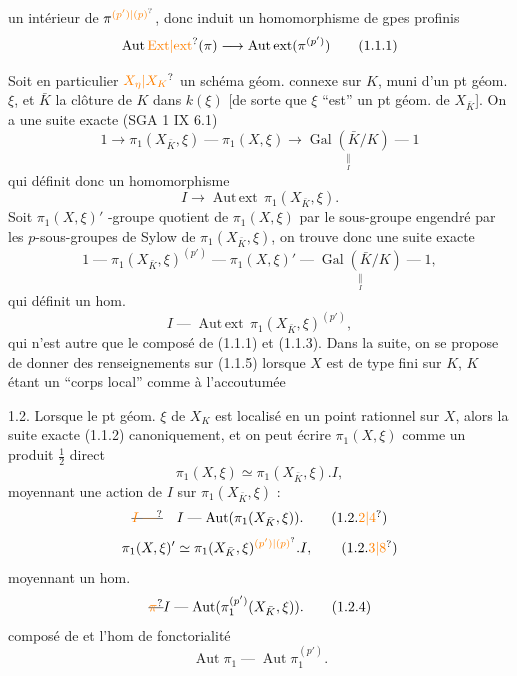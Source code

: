 un  intérieur de $\pi^{\unsure{(p')|(p)}}$, donc induit un homomorphisme de gpes profinis
\[
\operatorname{Aut\,\unsure{Ext|ext}}(\pi)\longrightarrow\operatorname{Aut\,ext}(\pi^{(p')})
\tag*{(1.1.1)}
\]

Soit en particulier $\unsure{X_\eta|X_K}$ un schéma géom. connexe sur $K$,  muni d'un pt géom. $\xi$, et $\bar K$ la clôture  de $K$ dans $k(\xi)$ [de sorte que $\xi$ ``est'' un pt géom. de $X_{\bar K}$]. On a une suite exacte (SGA 1 IX 6.1)
\[
1\to\pi_1(X_{\bar K},\xi)\mathrel{\text{---}}\pi_1(X,\xi)\longrightarrow
\underset{\underset{I}{\Vert}}{\operatorname{Gal}(\bar K/K)}\mathrel{\text{---}}1
\tag*{(1.1.2)}
\]
qui définit donc un homomorphisme
\[
I\longrightarrow\operatorname{Aut\,ext}\,\pi_1(X_{\bar K},\xi).
\tag*{(1.1.3)}
\]
Soit $\pi_1(X,\xi)'$   -groupe quotient de $\pi_1(X,\xi)$ par le sous-groupe   engendré par les $p$-sous-groupes de Sylow de $\pi_1(X_{\bar K},\xi)$, on trouve donc une suite exacte
\[
1\mathrel{\text{---}}\pi_1(X_{\bar K},\xi)^{(p')}\mathrel{\text{---}}\pi_1(X,\xi)'\mathrel{\text{---}}
\underset{\underset{I}{\Vert}}{\operatorname{Gal}(\bar K/K)}\mathrel{\text{---}}1,
\tag*{(1.1.4)}
\]
qui définit un hom.
\[
I\mathrel{\text{---}}\operatorname{Aut\,ext}\,\pi_1(X_{\bar K},\xi)^{(p')},
\tag*{(1.1.5)}
\]
qui n'est autre que le composé de (1.1.1) et (1.1.3).
Dans la suite, on se propose de donner des renseignements sur (1.1.5) lorsque $X$ est de type fini sur $K$, $K$ étant un ``corps local'' comme à l'accoutumée

1.2. Lorsque le  pt géom. $\xi$ de $X_K$ est localisé en un point rationnel sur $X$, alors la suite exacte (1.1.2)  canoniquement, et  on peut écrire $\pi_1(X,\xi)$ comme un produit $\frac12$ direct
\[
\pi_1(X,\xi)\simeq\pi_1(X_{\bar K},\xi).I,
\tag*{(1.2.1)}
\]
moyennant une action de $I$ sur $\pi_1(X_{\bar K},\xi)$ :
\[
\deleted{\unsure{I\mathrel{\text{---}}}}\quad I\mathrel{\text{---}}\operatorname{Aut}(\pi_1(X_{\bar K},\xi)).
\tag*{(1.2.\unsure{2|4})}
\]
\[
\pi_1(X,\xi)'\simeq\pi_1(X_{\bar K},\xi)^{\unsure{(p')|(p)}}.I,
\tag*{(1.2.\unsure{3|8})}
\]
moyennant un hom.
\[
\deleted{\unsure{\pi}}I\mathrel{\text{---}}\operatorname{Aut}(\pi_1^{(p')}(X_{\bar K},\xi)).
\tag*{(1.2.4)}
\]
composé de  et l'hom de fonctorialité
\[
\operatorname{Aut}\pi_1\mathrel{\text{---}}\operatorname{Aut}\pi_1^{(p')}.
\]

